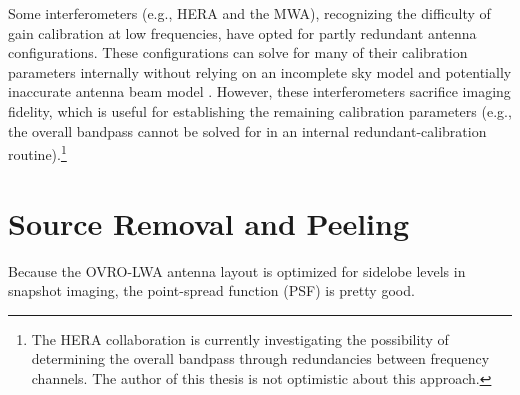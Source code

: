 \begin{bibunit}
Some interferometers (e.g., HERA and the MWA), recognizing the difficulty of gain calibration at low
frequencies, have opted for partly redundant antenna configurations. These configurations can solve
for many of their calibration parameters internally without relying on an incomplete sky model and
potentially inaccurate antenna beam model \citep{2010MNRAS.408.1029L}. However, these
interferometers sacrifice imaging fidelity, which is useful for establishing the remaining
calibration parameters (e.g., the overall bandpass cannot be solved for in an internal
redundant-calibration routine).\footnote{
    The HERA collaboration is currently investigating the possibility of determining the overall
    bandpass through redundancies between frequency channels. The author of this thesis is not
    optimistic about this approach.
}

\section{Source Removal and Peeling}


Because the OVRO-LWA antenna layout is optimized for sidelobe levels in snapshot imaging, the
point-spread function (PSF) is pretty good.

\end{bibunit}

